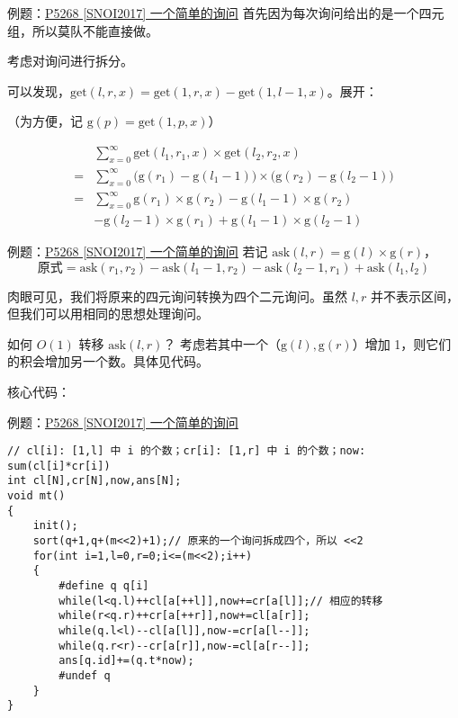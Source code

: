 \documentclass[table]{beamer}
\begin{document}
\begin{frame}{例题：{\color{blue}\href{https://www.luogu.com.cn/problem/P5268}{P5268 [SNOI2017] 一个简单的询问}}}
	首先因为每次询问给出的是一个四元组，所以莫队不能直接做。
	\pause

	考虑对询问进行拆分。

	可以发现，$\text{get}(l,r,x)=\text{get}(1,r,x)-\text{get}(1,l-1,x)$。展开：
	
	（为方便，记 $\text{g}(p)=\text{get}(1,p,x)$）

	$$
	\begin{aligned}
		&\sum\limits_{x=0}^\infty
		\text{get}(l_1,r_1,x)\times\text{get}(l_2,r_2,x)\\
		=&\sum\limits_{x=0}^\infty
		\big(\text{g}(r_1)-\text{g}(l_1-1)\big)\times
		\big(\text{g}(r_2)-\text{g}(l_2-1)\big)\\
		=&\sum\limits_{x=0}^\infty
		\text{g}(r_1)\times\text{g}(r_2)-\text{g}(l_1-1)\times\text{g}(r_2)\\
		&-\text{g}(l_2-1)\times\text{g}(r_1)+\text{g}(l_1-1)\times\text{g}(l_2-1)
	\end{aligned}
	$$

\end{frame}
\begin{frame}{例题：{\color{blue}\href{https://www.luogu.com.cn/problem/P5268}{P5268 [SNOI2017] 一个简单的询问}}}
	若记 $\text{ask}(l,r)=\text{g}(l)\times\text{g}(r)$，
	$$
	\text{原式}=\text{ask}(r_1,r_2)-\text{ask}(l_1-1,r_2)-\text{ask}(l_2-1,r_1)+\text{ask}(l_1,l_2)
	$$

	肉眼可见，我们将原来的四元询问转换为四个二元询问。虽然 $l,r$ 并不表示区间，但我们可以用相同的思想处理询问。
	
	如何 $O(1)$ 转移 $\text{ask}(l,r)$？
	考虑若其中一个（$\text{g}(l),\text{g}(r)$）增加 1，则它们的积会增加另一个数。具体见代码。
	
	核心代码：
\end{frame}
\begin{frame}[fragile]{例题：{\color{blue}\href{https://www.luogu.com.cn/problem/P5268}{P5268 [SNOI2017] 一个简单的询问}}}
\tiny
\begin{verbatim}
// cl[i]: [1,l] 中 i 的个数；cr[i]: [1,r] 中 i 的个数；now: sum(cl[i]*cr[i])
int cl[N],cr[N],now,ans[N];
void mt()
{
    init();
    sort(q+1,q+(m<<2)+1);// 原来的一个询问拆成四个，所以 <<2
    for(int i=1,l=0,r=0;i<=(m<<2);i++)
    {
        #define q q[i]
        while(l<q.l)++cl[a[++l]],now+=cr[a[l]];// 相应的转移
        while(r<q.r)++cr[a[++r]],now+=cl[a[r]];
        while(q.l<l)--cl[a[l]],now-=cr[a[l--]];
        while(q.r<r)--cr[a[r]],now-=cl[a[r--]];
        ans[q.id]+=(q.t*now);
        #undef q
    }
}
\end{verbatim}
\end{frame}
\end{document}

